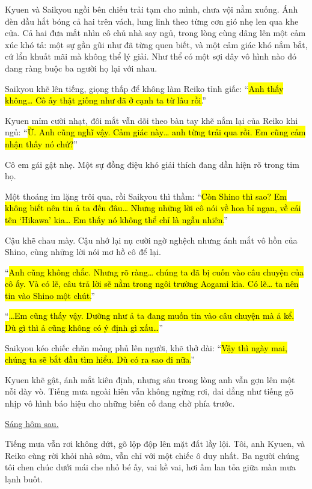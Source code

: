 \documentclass[../main.tex]{subfiles}
\begin{document}
Kyuen và Saikyou ngồi bên chiếu trải tạm cho mình, chưa vội nằm xuống. Ánh đèn dầu hắt bóng cả hai trên vách, lung linh theo từng cơn gió nhẹ len qua khe cửa. Cả hai đưa mắt nhìn cô chủ nhà say ngủ, trong lòng cùng dâng lên một cảm xúc khó tả: một sự gần gũi như đã từng quen biết, và một cảm giác khó nắm bắt, cứ lẩn khuất mãi mà không thể lý giải. Như thể có một sợi dây vô hình nào đó đang ràng buộc ba người họ lại với nhau.

Saikyou khẽ lên tiếng, giọng thấp để không làm Reiko tỉnh giấc: ``\hl{Anh thấy không\dots{} Cô ấy thật giống như đã ở cạnh ta từ lâu rồi.}''

Kyuen mỉm cười nhạt, đôi mắt vẫn dõi theo bàn tay khẽ nắm lại của Reiko khi ngủ: ``\hl{Ừ. Anh cũng nghĩ vậy. Cảm giác này\dots{} anh từng trải qua rồi. Em cũng cảm nhận thấy nó chứ?}''

Cô em gái gật nhẹ. Một sự đồng điệu khó giải thích đang dần hiện rõ trong tim họ.

Một thoáng im lặng trôi qua, rồi Saikyou thì thầm: ``\hl{Còn Shino thì sao? Em không biết nên tin ả ta đến đâu\dots{} Nhưng những lời cô nói về hoa bỉ ngạn, về cái tên `Hikawa' kia\dots{} Em thấy nó không thể chỉ là ngẫu nhiên.}''

Cậu khẽ chau mày. Cậu nhớ lại nụ cười ngờ nghệch nhưng ánh mắt vô hồn của Shino, cùng những lời nói mơ hồ cô để lại.

``\hl{Anh cũng không chắc. Nhưng rõ ràng\dots{} chúng ta đã bị cuốn vào câu chuyện của cô ấy. Và có lẽ, câu trả lời sẽ nằm trong ngôi trường Aogami kia. Có lẽ\dots{} ta nên tin vào Shino một chút.}''

``\hl{\dots Em cũng thấy vậy. Dường như ả ta đang muốn tin vào câu chuyện mà ả kể. Dù gì thì ả cũng không có ý định gì xấu\dots}''

Saikyou kéo chiếc chăn mỏng phủ lên người, khẽ thở dài: ``\hl{Vậy thì ngày mai, chúng ta sẽ bắt đầu tìm hiểu. Dù có ra sao đi nữa.}''

Kyuen khẽ gật, ánh mắt kiên định, nhưng sâu trong lòng anh vẫn gợn lên một nỗi dày vò. Tiếng mưa ngoài hiên vẫn không ngừng rơi, dai dẳng như tiếng gõ nhịp vô hình báo hiệu cho những biến cố đang chờ phía trước.

\begin{center}
  \uline{Sáng hôm sau.}
\end{center}

Tiếng mưa vẫn rơi không dứt, gõ lộp độp lên mặt đất lầy lội. Tôi, anh Kyuen, và Reiko cùng rời khỏi nhà sớm, vẫn chỉ với một chiếc ô duy nhất. Ba người chúng tôi chen chúc dưới mái che nhỏ bé ấy, vai kề vai, hơi ấm lan tỏa giữa màn mưa lạnh buốt.
\end{document}
